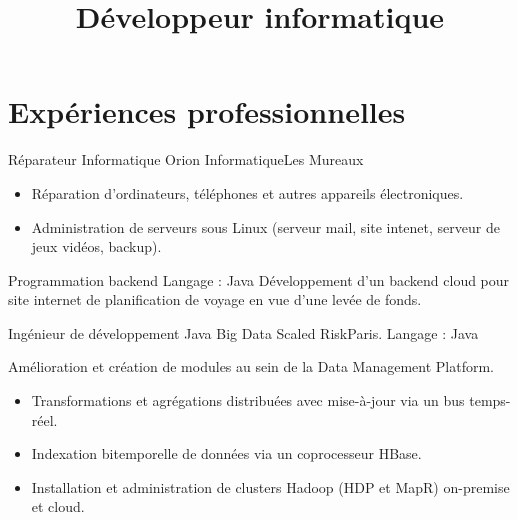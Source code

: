 \documentclass[11pt,a4paper,sans]{moderncv}
\title{Développeur informatique}
\begin{document}
\makecvtitle %
\vspace*{-.5cm}


\section{Expériences professionnelles}
\vspace{1em}

        {Réparateur Informatique}
        {Orion Informatique}{Les Mureaux}{}
        {
            \begin{itemize}
                \item Réparation d'ordinateurs, téléphones et autres appareils électroniques.
                \item Administration de serveurs sous Linux (serveur mail, site intenet, serveur de jeux vidéos, backup).
            \end{itemize}
        }

\vspace{1em}

        {Programmation backend}
        {}{Langage : Java}{}
        {
            Développement d'un backend cloud pour site internet de planification de voyage en vue d'une levée de fonds.
        }

\vspace{1em}

        {Ingénieur de développement Java Big Data}
        {Scaled Risk}{Paris. Langage : Java}{}
        {
            Amélioration et création de modules au sein de la Data Management Platform.
            \begin{itemize}
                \item Transformations et agrégations distribuées avec mise-à-jour via un bus temps-réel.
                \item Indexation bitemporelle de données via un coprocesseur HBase.
                \item Installation et administration de clusters Hadoop (HDP et MapR) on-premise et cloud.
            \end{itemize}
        }

\vspace{1em}
\end{document}
